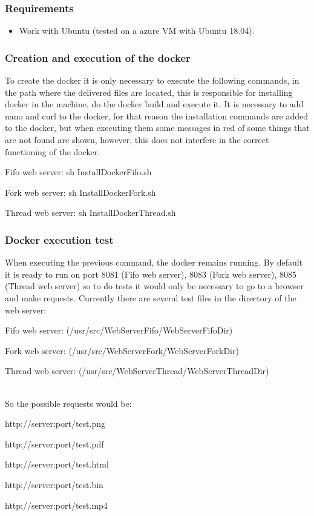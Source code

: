 \documentclass{article}
\begin{document}
\subsubsection{Requirements}
\begin{itemize}
    \item Work with Ubuntu (tested on a azure VM with Ubuntu 18.04).
\end{itemize}

\subsubsection{Creation and execution of the docker}
To create the docker it is only necessary to execute the following commands, in the path where the delivered files are located, this is responsible for installing docker in the machine, do the docker build and execute it. It is necessary to add nano and curl to the docker, for that reason the installation commands are added to the docker, but when executing them some messages in red of some things that are not found are shown, however, this does not interfere in the correct functioning of the docker.\\
\newline
\centerline{Fifo web server: sh InstallDockerFifo.sh}
\centerline{Fork web server: sh InstallDockerFork.sh}
\centerline{Thread web server: sh InstallDockerThread.sh}


\subsubsection{Docker execution test}
When executing the previous command, the docker remains running. By default it is ready to run on port 8081 (Fifo web server), 8083 (Fork web server), 8085 (Thread web server) so to do tests it would only be necessary to go to a browser and make requests. Currently there are several test files in the directory of the web server:\\
\newline
\centerline{Fifo web server: (/usr/src/WebServerFifo/WebServerFifoDir)}
\centerline{Fork web server: (/usr/src/WebServerFork/WebServerForkDir)}
\centerline{Thread web server: (/usr/src/WebServerThread/WebServerThreadDir)}
\newline
\\So the possible requests would be:\\
\newline
\centerline{http://server:port/test.png}
\centerline{http://server:port/test.pdf}
\centerline{http://server:port/test.html}
\centerline{http://server:port/test.bin}
\centerline{http://server:port/test.mp4}
		
\end{document}
